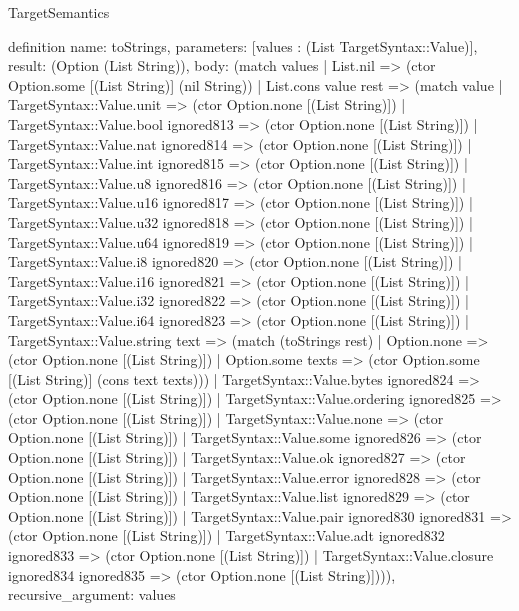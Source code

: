 \begin{lexlean}{TargetSemantics}
\begin{semanticmodule}
definition{
  name: toStrings,
  parameters: [values : (List TargetSyntax::Value)],
  result: (Option (List String)),
  body: (match values
    | List.nil => (ctor Option.some [(List String)] (nil String))
    | List.cons value rest => (match value
      | TargetSyntax::Value.unit => (ctor Option.none [(List String)])
      | TargetSyntax::Value.bool ignored813 => (ctor Option.none [(List String)])
      | TargetSyntax::Value.nat ignored814 => (ctor Option.none [(List String)])
      | TargetSyntax::Value.int ignored815 => (ctor Option.none [(List String)])
      | TargetSyntax::Value.u8 ignored816 => (ctor Option.none [(List String)])
      | TargetSyntax::Value.u16 ignored817 => (ctor Option.none [(List String)])
      | TargetSyntax::Value.u32 ignored818 => (ctor Option.none [(List String)])
      | TargetSyntax::Value.u64 ignored819 => (ctor Option.none [(List String)])
      | TargetSyntax::Value.i8 ignored820 => (ctor Option.none [(List String)])
      | TargetSyntax::Value.i16 ignored821 => (ctor Option.none [(List String)])
      | TargetSyntax::Value.i32 ignored822 => (ctor Option.none [(List String)])
      | TargetSyntax::Value.i64 ignored823 => (ctor Option.none [(List String)])
      | TargetSyntax::Value.string text => (match (toStrings rest)
        | Option.none => (ctor Option.none [(List String)])
        | Option.some texts => (ctor Option.some [(List String)] (cons text texts)))
      | TargetSyntax::Value.bytes ignored824 => (ctor Option.none [(List String)])
      | TargetSyntax::Value.ordering ignored825 => (ctor Option.none [(List String)])
      | TargetSyntax::Value.none => (ctor Option.none [(List String)])
      | TargetSyntax::Value.some ignored826 => (ctor Option.none [(List String)])
      | TargetSyntax::Value.ok ignored827 => (ctor Option.none [(List String)])
      | TargetSyntax::Value.error ignored828 => (ctor Option.none [(List String)])
      | TargetSyntax::Value.list ignored829 => (ctor Option.none [(List String)])
      | TargetSyntax::Value.pair ignored830 ignored831 => (ctor Option.none [(List String)])
      | TargetSyntax::Value.adt ignored832 ignored833 => (ctor Option.none [(List String)])
      | TargetSyntax::Value.closure ignored834 ignored835 => (ctor Option.none [(List String)]))),
  recursive_argument: values
}


\end{semanticmodule}
\end{lexlean}
